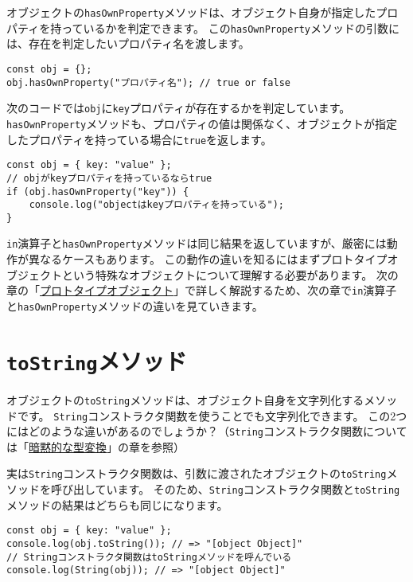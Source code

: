 オブジェクトの\texttt{hasOwnProperty}メソッドは、オブジェクト自身が指定したプロパティを持っているかを判定できます。
この\texttt{hasOwnProperty}メソッドの引数には、存在を判定したいプロパティ名を渡します。

\begin{lstlisting}
const obj = {};
obj.hasOwnProperty("プロパティ名"); // true or false
\end{lstlisting}

次のコードでは\texttt{obj}に\texttt{key}プロパティが存在するかを判定しています。
\texttt{hasOwnProperty}メソッドも、プロパティの値は関係なく、オブジェクトが指定したプロパティを持っている場合に\texttt{true}を返します。

\begin{lstlisting}
const obj = { key: "value" };
// objがkeyプロパティを持っているならtrue
if (obj.hasOwnProperty("key")) {
    console.log("objectはkeyプロパティを持っている");
}
\end{lstlisting}

\texttt{in}演算子と\texttt{hasOwnProperty}メソッドは同じ結果を返していますが、厳密には動作が異なるケースもあります。
この動作の違いを知るにはまずプロトタイプオブジェクトという特殊なオブジェクトについて理解する必要があります。
次の章の「\hyperlink{prototype-object}{プロトタイプオブジェクト}」で詳しく解説するため、次の章で\texttt{in}演算子と\texttt{hasOwnProperty}メソッドの違いを見ていきます。

\hypertarget{toString-method}{%
\section{\texorpdfstring{\texttt{toString}メソッド}{toStringメソッド}}\label{toString-method}}

オブジェクトの\texttt{toString}メソッドは、オブジェクト自身を文字列化するメソッドです。
\texttt{String}コンストラクタ関数を使うことでも文字列化できます。
この2つにはどのような違いがあるのでしょうか？（\texttt{String}コンストラクタ関数については「\hyperlink{implicit-coercion}{暗黙的な型変換}」の章を参照）

実は\texttt{String}コンストラクタ関数は、引数に渡されたオブジェクトの\texttt{toString}メソッドを呼び出しています。
そのため、\texttt{String}コンストラクタ関数と\texttt{toString}メソッドの結果はどちらも同じになります。

\begin{lstlisting}
const obj = { key: "value" };
console.log(obj.toString()); // => "[object Object]"
// Stringコンストラクタ関数はtoStringメソッドを呼んでいる
console.log(String(obj)); // => "[object Object]"
\end{lstlisting}


